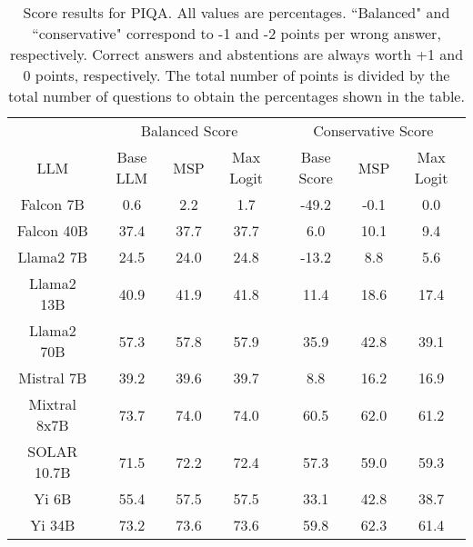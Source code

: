 \renewcommand\arraystretch{1.2}
\begin{table*}
\centering
\begin{tabular}{c|c|c|c|c|c|c}
& \multicolumn{3}{c|}{Balanced Score} & \multicolumn{3}{c}{Conservative Score} \\ 
LLM & Base LLM & MSP & Max Logit & Base Score & MSP & Max Logit\\ \hline
Falcon 7B & 0.6 & 2.2 & 1.7 & -49.2 & -0.1 & 0.0\\
Falcon 40B & 37.4 & 37.7 & 37.7 & 6.0 & 10.1 & 9.4\\
Llama2 7B & 24.5 & 24.0 & 24.8 & -13.2 & 8.8 & 5.6\\
Llama2 13B & 40.9 & 41.9 & 41.8 & 11.4 & 18.6 & 17.4\\
Llama2 70B & 57.3 & 57.8 & 57.9 & 35.9 & 42.8 & 39.1\\
Mistral 7B & 39.2 & 39.6 & 39.7 & 8.8 & 16.2 & 16.9\\
Mixtral 8x7B & 73.7 & 74.0 & 74.0 & 60.5 & 62.0 & 61.2\\
SOLAR 10.7B & 71.5 & 72.2 & 72.4 & 57.3 & 59.0 & 59.3\\
Yi 6B & 55.4 & 57.5 & 57.5 & 33.1 & 42.8 & 38.7\\
Yi 34B & 73.2 & 73.6 & 73.6 & 59.8 & 62.3 & 61.4\\
\hline
\end{tabular}
\caption{Score results for PIQA. All values are percentages. ``Balanced" and ``conservative" correspond to -1 and -2 points per wrong answer, respectively. Correct answers and abstentions are always worth +1 and 0 points, respectively. The total number of points is divided by the total number of questions to obtain the percentages shown in the table.}
\label{tab:piqa_score}
\end{table*}
